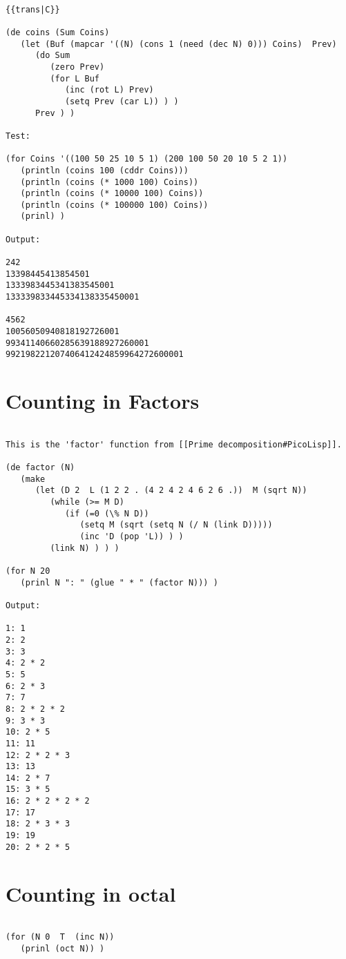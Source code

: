 \begin{verbatim}

{{trans|C}}

(de coins (Sum Coins)
   (let (Buf (mapcar '((N) (cons 1 (need (dec N) 0))) Coins)  Prev)
      (do Sum
         (zero Prev)
         (for L Buf
            (inc (rot L) Prev)
            (setq Prev (car L)) ) )
      Prev ) )

Test:

(for Coins '((100 50 25 10 5 1) (200 100 50 20 10 5 2 1))
   (println (coins 100 (cddr Coins)))
   (println (coins (* 1000 100) Coins))
   (println (coins (* 10000 100) Coins))
   (println (coins (* 100000 100) Coins))
   (prinl) )

Output:

242
13398445413854501
1333983445341383545001
133339833445334138335450001

4562
10056050940818192726001
99341140660285639188927260001
992198221207406412424859964272600001

\end{verbatim}

\section*{Counting in Factors}

\begin{verbatim}

This is the 'factor' function from [[Prime decomposition#PicoLisp]].

(de factor (N)
   (make
      (let (D 2  L (1 2 2 . (4 2 4 2 4 6 2 6 .))  M (sqrt N))
         (while (>= M D)
            (if (=0 (\% N D))
               (setq M (sqrt (setq N (/ N (link D)))))
               (inc 'D (pop 'L)) ) )
         (link N) ) ) )

(for N 20
   (prinl N ": " (glue " * " (factor N))) )

Output:

1: 1
2: 2
3: 3
4: 2 * 2
5: 5
6: 2 * 3
7: 7
8: 2 * 2 * 2
9: 3 * 3
10: 2 * 5
11: 11
12: 2 * 2 * 3
13: 13
14: 2 * 7
15: 3 * 5
16: 2 * 2 * 2 * 2
17: 17
18: 2 * 3 * 3
19: 19
20: 2 * 2 * 5

\end{verbatim}

\section*{Counting in octal}

\begin{verbatim}

(for (N 0  T  (inc N))
   (prinl (oct N)) )

\end{verbatim}


